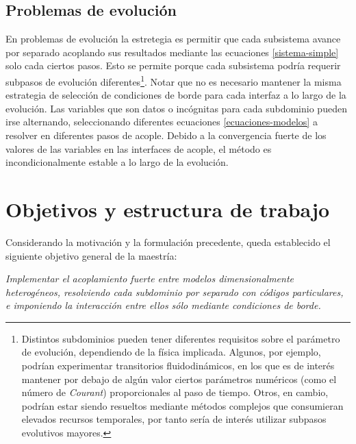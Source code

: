 \subsection*{Problemas de evolución}
\label{1:evolucion}
En problemas de evolución la estretegia es permitir que cada subsistema avance por separado acoplando sus resultados mediante las ecuaciones \ref{sistema-simple} solo cada ciertos pasos.
Esto se permite porque cada subsistema podría requerir subpasos de evolución diferentes\footnote{
Distintos subdominios pueden tener diferentes requisitos sobre el parámetro de evolución, dependiendo de la física implicada.
Algunos, por ejemplo, podrían experimentar transitorios fluidodinámicos, en los que es de interés mantener por debajo de algún valor 
ciertos parámetros numéricos (como el número de \textit{Courant}) proporcionales al paso de tiempo.
Otros, en cambio, podrían estar siendo resueltos mediante métodos complejos que consumieran elevados recursos temporales,
por tanto sería de interés utilizar subpasos evolutivos mayores.
}. Notar que no es necesario mantener la misma estrategia de selección de condiciones de borde para cada interfaz a lo largo de la evolución.
Las variables que son datos o incógnitas para cada subdominio pueden irse alternando,
seleccionando diferentes ecuaciones \ref{ecuaciones-modelos} a resolver en diferentes pasos de acople.
Debido a la convergencia fuerte de los valores de las variables en las interfaces de acople,
el método es incondicionalmente estable a lo largo de la evolución.

\section{Objetivos y estructura de trabajo}
\label{1:objetivos}
Considerando la motivación y la formulación precedente, queda establecido el siguiente objetivo general de la maestría:

\vspace{1em}
\begin{addmargin}[1.5em]{1.5em}
\textit{Implementar el acoplamiento fuerte entre modelos dimensionalmente heterogéneos,
resolviendo cada subdominio por separado con códigos particulares, e imponiendo la
interacción entre ellos sólo mediante condiciones de borde.}
\end{addmargin}
\vspace{1em}

